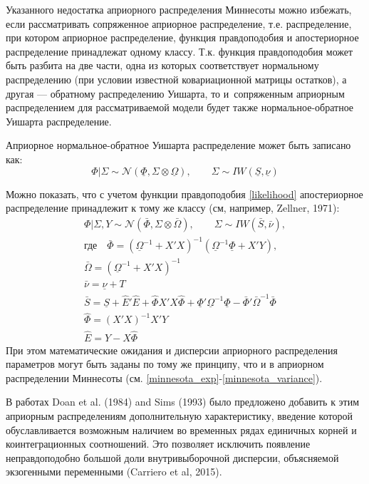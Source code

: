 \documentclass[11pt]{article} %
\newcommand{\cN}{\mathcal{N}}
\begin{document}
Указанного недостатка априорного распределения Миннесоты можно избежать, если рассматривать сопряженное априорное распределение, т.е. распределение, при котором  априорное распределение, функция правдоподобия и апостериорное распределение принадлежат одному классу. Т.к. функция правдоподобия может быть разбита на две части, одна из которых соответствует нормальному распределению (при условии известной ковариационной матрицы остатков), а другая --- обратному распределению Уишарта, то и~сопряженным априорным распределением для рассматриваемой модели будет также нормальное-обратное Уишарта распределение.


Априорное нормальное-обратное Уишарта распределение может быть записано как:
\begin{equation}
\Phi|\Sigma\sim \cN (\underline \Phi, \Sigma\otimes\underline \Omega), \qquad \Sigma\sim IW(\underline S, \underline \nu)
\end{equation}

Можно показать, что с учетом функции правдоподобия \eqref{likelihood} апостериорное распределение принадлежит к тому же классу (см, например, Zellner, 1971):
\begin{gather}
\Phi|\Sigma,Y\sim \cN (\bar \Phi, \Sigma\otimes\bar \Omega), \qquad \Sigma\sim IW(\bar S, \bar \nu),\\
\mbox{где}\quad \bar \Phi=(\underline \Omega^{-1}+X'X)^{-1}(\underline \Omega^{-1}\underline \Phi+X'Y),\\
\bar{\Omega}=(\underline \Omega^{-1}+X'X)^{-1}\\
\bar\nu =\underline \nu+T\\
\bar S=\underline S +\hat E'\hat E+\hat \Phi X'X \hat \Phi +\underline \Phi'\underline\Omega^{-1}\underline \Phi-\bar \Phi'\bar\Omega^{-1}\bar \Phi\\
\hat\Phi=(X'X)^{-1}X'Y\\%
\hat E=Y-X\hat\Phi
\end{gather}
При этом математические ожидания и дисперсии априорного распределения параметров могут быть заданы по тому же принципу, что и в априорном распределении Миннесоты (см. \eqref{minnesota_exp}-\eqref{minnesota_variance}).

В работах Doan et al. (1984) and Sims (1993) было предложено добавить к этим априорным распределениям дополнительную характеристику, введение которой обуславливается возможным наличием во временных рядах единичных корней и коинтеграционных  соотношений. Это позволяет исключить появление неправдоподобно большой доли внутривыборочной дисперсии, объясняемой экзогенными переменными (Carriero et al, 2015). %
\end{document}
